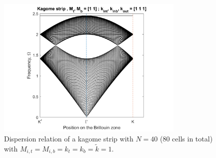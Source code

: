 \begin{figure}[!h]
\centering
\includegraphics[width=0.8\textwidth]{imgs/kagomestrip.png}
\caption{\label{fig:kagomestripdisper} Dispersion relation of a kagome strip
  with $N=40$ (80 cells in total) with $M_{i,t}=M_{i,b}=k_t=k_b=\tilde{k}=1$.}
\end{figure}


